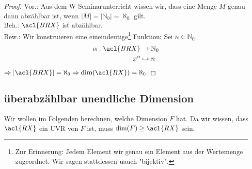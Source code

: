 \begin{proof}
Vor.: Aus dem W-Seminarunterricht wissen wir, dass eine Menge $M$ genau dann abzählbar ist, wenn $|M|=|\mathbb{N}_0|=\aleph_0$ gilt.
\\Beh.: $\acl{BRX}$ ist abzählbar.
\\Bew.: Wir konstruieren eine eineindeutige\footnote{Zur Erinnerung: Jedem Element wir genau ein Element aus der Wertemenge zugeordnet. Wir sagen stattdessen uauch "bijektiv".} Funktion: Sei $n \in \mathbb{N}_0$.
\begin{align}
\alpha: \acl{BRX} &\rightarrow \mathbb{N}_0
\\ x^n &\mapsto n \end{align}
$\Rightarrow |\acl{BRX}|=\aleph_0 \Rightarrow \dim(\acl{RX})=\aleph_0$ 
\end{proof}

\subsection*{überabzählbar unendliche Dimension}
Wir wollen im Folgenden berechnen, welche Dimension $F$ hat. Da wir wissen, dass $\acl{RX}$ ein \acl{UVR} von $F$ ist, muss $\dim(F)\geq\acl{RX}$ sein.









